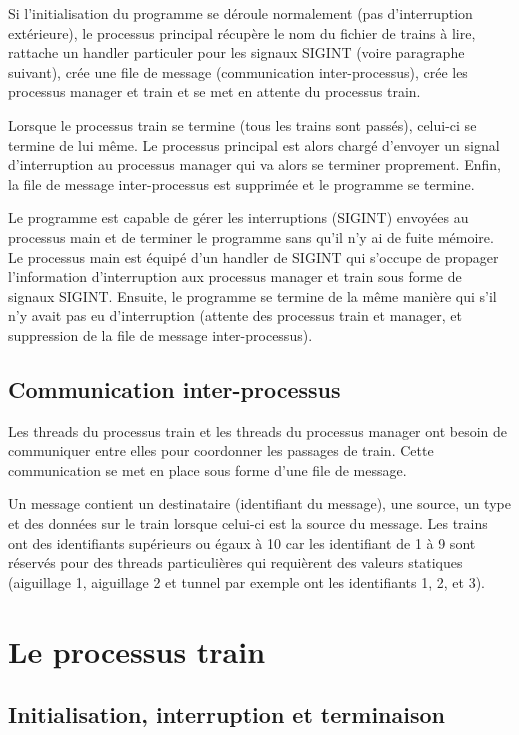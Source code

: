 \documentclass[a4paper,12pt]{article}
\begin{document}
Si l'initialisation du programme se déroule normalement (pas d'interruption extérieure), le processus principal récupère le nom du fichier de trains à lire, rattache un handler particuler pour les signaux SIGINT (voire paragraphe suivant), crée une file de message (communication inter-processus), crée les processus manager et train et se met en attente du processus train.

Lorsque le processus train se termine (tous les trains sont passés), celui-ci se termine de lui même. Le processus principal est alors chargé d'envoyer un signal d'interruption au processus manager qui va alors se terminer proprement. Enfin, la file de message inter-processus est supprimée et le programme se termine.

Le programme est capable de gérer les interruptions (SIGINT) envoyées au processus main et de terminer le programme sans qu'il n'y ai de fuite mémoire. Le processus main est équipé d'un handler de SIGINT qui s'occupe de propager l'information d'interruption aux processus manager et train sous forme de signaux SIGINT. Ensuite, le programme se termine de la même manière qui s'il n'y avait pas eu d'interruption (attente des processus train et manager, et suppression de la file de message inter-processus).

\subsection{Communication inter-processus}

Les threads du processus train et les threads du processus manager ont besoin de communiquer entre elles pour coordonner les passages de train. Cette communication se met en place sous forme d'une file de message.

Un message contient un destinataire (identifiant du message), une source, un type et des données sur le train lorsque celui-ci est la source du message. Les trains ont des identifiants supérieurs ou égaux à 10 car les identifiant de 1 à 9 sont réservés pour des threads particulières qui requièrent des valeurs statiques (aiguillage 1, aiguillage 2 et tunnel par exemple ont les identifiants 1, 2, et 3).

\section{Le processus train}

\subsection{Initialisation, interruption et terminaison}
\end{document}
